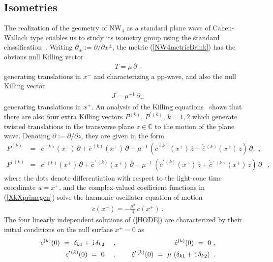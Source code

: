 \documentclass[11pt,a4paper]{article}
\newcommand{\ii}{{\rm i}}
\def\ii{{\,{\rm i}\,}}
\newcommand{\complex}{{\mathbb C}} %
\def\nn{\nonumber}
\def\bea{\begin{eqnarray}}
\def\eea{\end{eqnarray}}
\newcommand{\beq}{\begin{eqnarray}}
\newcommand{\eeq}{\end{eqnarray}}
\begin{document}
\subsection{Isometries \label{Isoms}}

The realization of the geometry of NW$_4$ as a standard plane wave of
Cahen-Wallach type enables us to study its isometry group using the
standard classification~\cite{BOL1}. Writing $\partial_\pm:=\partial/\partial
x^\pm$, the metric (\ref{NW4metricBrink}) has the obvious null Killing
vector
\beq
T=\mu\,\partial_-
\label{ZKilling}\eeq
generating translations in $x^-$ and characterizing a pp-wave, and
also the null Killing vector
\beq
J=\mu^{-1}\,\partial_+
\label{HKilling}\eeq
generating translations in $x^+$. An analysis of the Killing
equations~\cite{BOL1} shows that there are also four extra
Killing vectors $P^{(k)}$, $P^{\prime\,(k)}$, $k=1,2$ which generate
twisted translations in the transverse plane $z\in\complex$ to
the motion of the plane wave. Denoting $\partial:=\partial/\partial
z$, they are given in the form
\bea
P^{(k)}&=&c^{(k)}(x^+)\,\partial+\overline{c}^{\,(k)}(x^+)\,
\overline{\partial}-\mu^{-1}\,\left(\dot c^{(k)}(x^+)\,\overline{z}+
\dot{\overline{c}}{}^{\,(k)}(x^+)\,z\right)\,\partial_- \ , \nn\\
P^{\prime\,(k)}&=&c^{\prime\,(k)}(x^+)\,\partial+\overline{c}^{\,
\prime\,(k)}(x^+)\,
\overline{\partial}-\mu^{-1}\,\left(\dot c^{\prime\,(k)}(x^+)\,\overline{z}+
\dot{\overline{c}}{}^{\,\prime\,(k)}(x^+)\,z\right)\,\partial_- \ ,
\label{XkXprimegen}\eea
where the dots denote differentiation with respect to the light-cone
time coordinate $u=x^+$, and the complex-valued coefficient functions in
(\ref{XkXprimegen}) solve the harmonic oscillator equation of motion
\beq
\ddot c(x^+)=-\mbox{$\frac{\mu^2}4$}\,c(x^+) \ .
\label{HODE}\eeq
The four linearly independent solutions of (\ref{HODE}) are
characterized by their initial conditions on the null surface $x^+=0$
as
\bea
c^{(k)}(0)~=~\delta_{k1}+\ii\delta_{k2} ~~~~ &,& ~~~~ \dot c^{(k)}(0)~=~0
\ , \nn\\c^{\prime\,(k)}(0)~=~0 ~~~~ &,& ~~~~ \dot
c^{\prime\,(k)}(0)~=~\mu\,\left(\delta_{k1}+\ii\delta_{k2}\right) \ .
\label{cinitialconds}\eea
\end{document}
